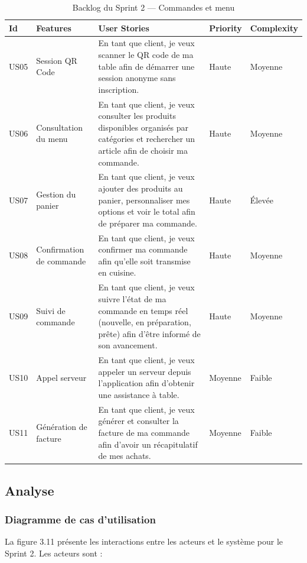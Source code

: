 \begin{table}[h]
\centering
\caption{Backlog du Sprint 2 — Commandes et menu}
\begin{tabular}{|p{1cm}|p{2.5cm}|p{6cm}|p{1.5cm}|p{1.5cm}|}
\hline
\textbf{Id} & \textbf{Features} & \textbf{User Stories} & \textbf{Priority} & \textbf{Complexity} \\
\hline
US05 & Session QR Code & En tant que client, je veux scanner le QR code de ma table afin de démarrer une session anonyme sans inscription. & Haute & Moyenne \\
\hline
US06 & Consultation du menu & En tant que client, je veux consulter les produits disponibles organisés par catégories et rechercher un article afin de choisir ma commande. & Haute & Moyenne \\
\hline
US07 & Gestion du panier & En tant que client, je veux ajouter des produits au panier, personnaliser mes options et voir le total afin de préparer ma commande. & Haute & Élevée \\
\hline
US08 & Confirmation de commande & En tant que client, je veux confirmer ma commande afin qu'elle soit transmise en cuisine. & Haute & Moyenne \\
\hline
US09 & Suivi de commande & En tant que client, je veux suivre l'état de ma commande en temps réel (nouvelle, en préparation, prête) afin d'être informé de son avancement. & Haute & Moyenne \\
\hline
US10 & Appel serveur & En tant que client, je veux appeler un serveur depuis l'application afin d'obtenir une assistance à table. & Moyenne & Faible \\
\hline
US11 & Génération de facture & En tant que client, je veux générer et consulter la facture de ma commande afin d'avoir un récapitulatif de mes achats. & Moyenne & Faible \\
\hline
\end{tabular}
\end{table}

\subsection{Analyse}

\subsubsection{Diagramme de cas d'utilisation}

La figure 3.11 présente les interactions entre les acteurs et le système pour le Sprint 2. Les acteurs sont :


